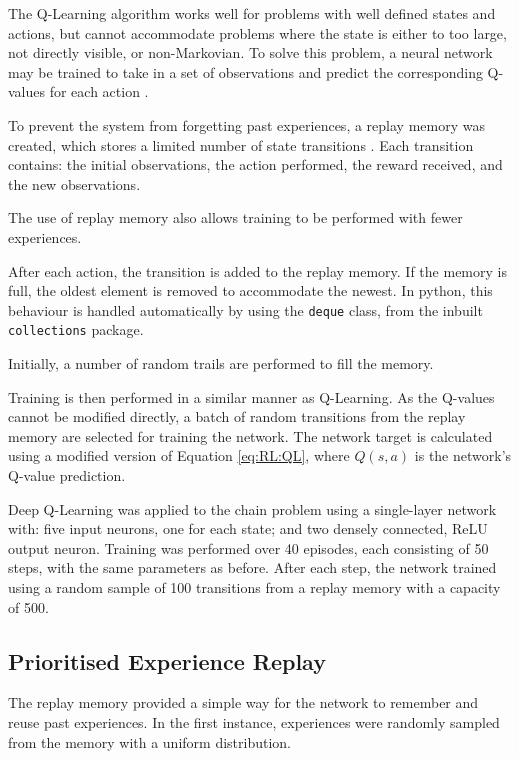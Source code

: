 The Q-Learning algorithm works well for problems with well defined states and
actions, but cannot accommodate problems where the state is either to too large,
not directly visible, or non-Markovian.
To solve this problem, a neural network may be trained to take in a set of
observations and predict the corresponding Q-values for each action
\citep{Lin:1990:Self}.

To prevent the system from forgetting past experiences, a replay memory was
created, which stores a limited number of state transitions
\citep{Lin:1992:Self}.
Each transition contains: the initial observations, the action performed,
the reward received, and the new observations.

The use of replay memory also allows training to be performed with fewer
experiences.

After each action, the transition is added to the replay memory.
If the memory is full, the oldest element is removed to accommodate the newest.
In python, this behaviour is handled automatically by using the \texttt{deque}
class, from the inbuilt \texttt{collections} package.

Initially, a number of random trails are performed to fill the memory.

Training is then performed in a similar manner as Q-Learning.
As the Q-values cannot be modified directly, a batch of random transitions from
the replay memory are selected for training the network.
The network target is calculated using a modified version of Equation
\ref{eq:RL:QL}, where $Q(s,a)$ is the network's Q-value prediction.

Deep Q-Learning was applied to the chain problem using a single-layer network
with: five input neurons, one for each state; and two densely connected, ReLU
output neuron.
Training was performed over 40 episodes, each consisting of 50 steps, with the
same parameters as before.
After each step, the network trained using a random sample of 100 transitions
from a replay memory with a capacity of 500.



\subsection{Prioritised Experience Replay}

The replay memory provided a simple way for the network to remember and reuse
past experiences.
In the first instance, experiences were randomly sampled from the memory with a
uniform distribution.

